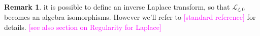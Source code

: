 \documentclass{article}
\newcommand{\singexp}[2]{\mathcal{H}L^\infty_{#1, #2}}
\newcommand{\C}{\mathbb{C}}
\newcommand{\series}[1]{\tilde{#1}}
\newcommand*{\defeq}{\mathrel{\vcenter{\baselineskip0.5ex \lineskiplimit0pt
                     \hbox{\scriptsize.}\hbox{\scriptsize.}}}%
                     =}
\newcommand{\laplace}{\mathcal{L}}
\newcommand{\borel}{\mathcal{B}}
\theoremstyle{definition}
\newtheorem{remark}[definition]{Remark}
\theoremstyle{plain}
\newtheorem{lemma}[definition]{Lemma}
\newenvironment{verify}{\color{ForestGreen}}{\color{black}}
\begin{document}
\begin{remark}
    it is possible to define an inverse Laplace transform, so that $\laplace_{\zeta,0}$ becomes an algebra isomorphisms. However we'll refer to \textcolor{magenta}{[standard reference]} for details. \textcolor{magenta}{[see also section on Regularity for Laplace]}  
\end{remark}

\end{document}
